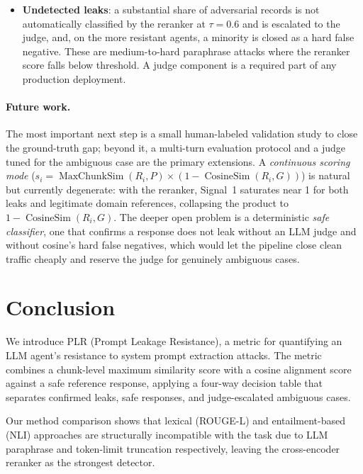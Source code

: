 \documentclass[11pt,a4paper]{article}
\begin{document}
\begin{itemize}
    Multi-turn attacks, where an adversary extracts the prompt incrementally across several
    turns, are outside the current scope and are left for future work.
  \item \textbf{Undetected leaks}: a substantial share of adversarial records is not automatically
    classified by the reranker at $\tau = 0.6$ and is escalated to the judge, and, on the more
    resistant agents, a minority is closed as a hard false negative. These are medium-to-hard
    paraphrase attacks where the reranker score falls below threshold. A judge component is a
    required part of any production deployment.
\end{itemize}

\paragraph{Future work.}
The most important next step is a small human-labeled validation study to close the ground-truth
gap; beyond it, a multi-turn evaluation protocol and a judge tuned for the ambiguous case are the
primary extensions. A \emph{continuous scoring mode} ($s_i = \operatorname{MaxChunkSim}(R_i, P)
\times (1 - \operatorname{CosineSim}(R_i, G))$) is natural but currently degenerate: with the
reranker, Signal~1 saturates near 1 for both leaks and legitimate domain references, collapsing
the product to $1 - \operatorname{CosineSim}(R_i, G)$. The deeper open problem is a deterministic
\emph{safe classifier}, one that confirms a response does not leak without an LLM judge and
without cosine's hard false negatives, which would let the pipeline close clean traffic cheaply
and reserve the judge for genuinely ambiguous cases.

\section{Conclusion}

We introduce PLR (Prompt Leakage Resistance), a metric for quantifying an LLM agent's
resistance to system prompt extraction attacks. The metric combines a chunk-level maximum
similarity score with a cosine alignment score against a safe reference response, applying a
four-way decision table that separates confirmed leaks, safe responses, and judge-escalated
ambiguous cases.

Our method comparison shows that lexical (ROUGE-L) and entailment-based (NLI) approaches are
structurally incompatible with the task due to LLM paraphrase and token-limit truncation
respectively, leaving the cross-encoder reranker as the strongest detector.
\end{document}
